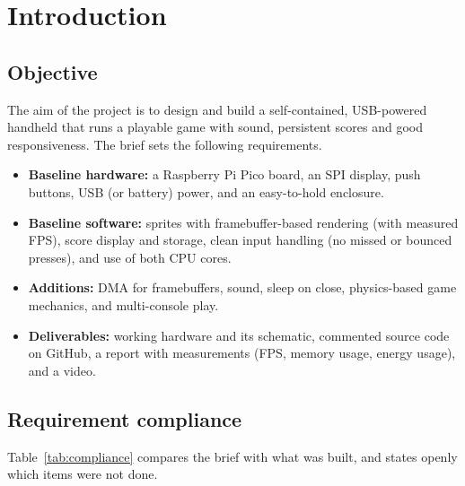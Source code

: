 \documentclass[11pt,a4paper]{article}
\begin{document}
\tableofcontents
\newpage

\section{Introduction}

\subsection{Objective}
The aim of the project is to design and build a self-contained, USB-powered
handheld that runs a playable game with sound, persistent scores and good
responsiveness. The brief sets the following requirements.

\begin{itemize}
  \item \textbf{Baseline hardware:} a Raspberry Pi Pico board, an SPI display,
        push buttons, USB (or battery) power, and an easy-to-hold enclosure.
  \item \textbf{Baseline software:} sprites with framebuffer-based rendering
        (with measured FPS), score display and storage, clean input handling (no
        missed or bounced presses), and use of both CPU cores.
  \item \textbf{Additions:} DMA for framebuffers, sound, sleep on close,
        physics-based game mechanics, and multi-console play.
  \item \textbf{Deliverables:} working hardware and its schematic, commented
        source code on GitHub, a report with measurements (FPS, memory usage,
        energy usage), and a video.
\end{itemize}

\subsection{Requirement compliance}
Table~\ref{tab:compliance} compares the brief with what was built, and states
openly which items were not done.
\end{document}
